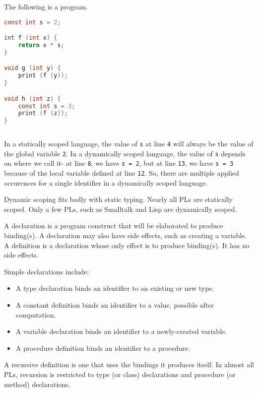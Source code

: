 \documentclass[a4paper, openany]{memoir}
\begin{document}
The following is a program.
\begin{lstlisting}[language=C]
const int s = 2;

int f (int x) {
    return x * s;
}

void g (int y) {
    print (f (y));
}

void h (int z) {
    const int s = 3;
    print (f (z));
} 
    
\end{lstlisting}
In a statically scoped language, the value of \texttt{s} at line \texttt{4} will always be the value of the global variable \texttt{2}. In a dynamically scoped language, the value of \texttt{s} depends on where we call it- at line \texttt{8}, we have \texttt{s = 2}, but at line \texttt{13}, we have \texttt{s = 3} because of the local variable defined at line \texttt{12}. So, there are multiple applied occurences for a single identifier in a dynamically scoped language.

Dynamic scoping fits badly with static typing. Nearly all PLs are statically scoped. Only a few PLs, such as Smalltalk and Lisp are dynamically scoped.

A declaration is a program construct that will be elaborated to produce binding(s). A declaration may also have side effects, such as creating a variable. A definition is a declaration whose only effect is to produce binding(s). It has no side effects.

Simple declarations include:
\begin{itemize}
    \item A type declaration binds an identifier to an existing or new type.
    \item A constant definition binds an identifier to a value, possible after computation.
    \item A variable declaration binds an identifier to a newly-created variable.
    \item A procedure definition binds an identifier to a procedure.
\end{itemize}

A recursive definition is one that uses the bindings it produces itself. In almost all PLs, recursion is restricted to type (or class) declarations and procedure (or method) declarations. 
\end{document}
